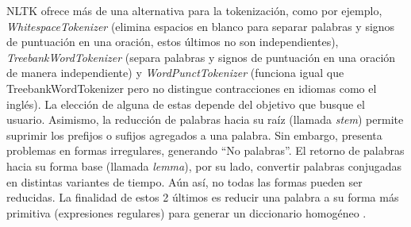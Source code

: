 NLTK ofrece más de una alternativa para la tokenización, como por ejemplo, \textit{WhitespaceTokenizer} (elimina espacios en blanco para separar palabras y signos de puntuación en una oración, estos últimos no son independientes), \textit{TreebankWordTokenizer} (separa palabras y signos de puntuación en una oración de manera independiente) y \textit{WordPunctTokenizer} (funciona igual que TreebankWordTokenizer pero no distingue contracciones en idiomas como el inglés). La elección de alguna de estas depende del objetivo que busque el usuario. Asimismo, la reducción de palabras hacia su raíz (llamada \textit{stem}) permite suprimir los prefijos o sufijos agregados a una palabra. Sin embargo, presenta problemas en formas irregulares, generando “No palabras”. El retorno de palabras hacia su forma base (llamada \textit{lemma}), por su lado, convertir palabras conjugadas en distintas variantes de tiempo. Aún así, no todas las formas pueden ser reducidas. La finalidad de estos 2 últimos es reducir una palabra a su forma más primitiva (expresiones regulares) para generar un diccionario homogéneo \parencite{tec_zimovnov2018text_preprocessing}.

